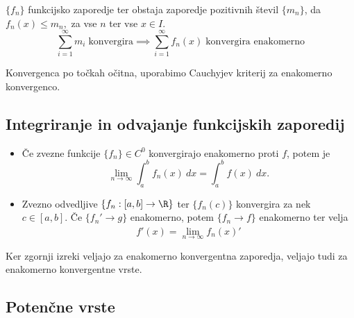 \documentclass[12pt, a4paper, unicode]{article}
\begin{document}
\begin{izrek}
$\{f_n\}$ funkcijsko zaporedje ter obstaja zaporedje pozitivnih števil $\{m_n\}$, da $f_n(x) \leq m_n,$ za vse $n$ ter vse $x \in I$. $$\sum_{i=1}^{\infty}m_i \; \text{konvergira} \implies \sum_{i=1}^{\infty}f_n(x) \; \text{konvergira enakomerno}$$
\end{izrek}
\begin{oris}
Konvergenca po točkah očitna, uporabimo Cauchyjev kriterij za enakomerno konvergenco.
\end{oris}

\subsection{Integriranje in odvajanje funkcijskih zaporedij}
\begin{izrek}
\begin{itemize}
    \item Če zvezne funkcije $\{f_n\} \in C^0$ konvergirajo enakomerno proti $f$, potem je $$\lim_{n \to \infty} \int_{a}^{b}f_n(x) \: dx = \int_a^b f(x) \: dx .$$
    \item Zvezno odvedljive $\{f_n: [a,b] \to \R\}$ ter $\{f_n(c)\}$ konvergira za nek $c \in [a,b]$. \newline Če $\{f_n' \xrightarrow[]{} g\}$ enakomerno, potem $\{f_n \xrightarrow[]{} f\}$ enakomerno ter velja $$f'(x) = \lim_{n \to \infty}f_n(x)'$$
\end{itemize}    
\end{izrek}
Ker zgornji izreki veljajo za enakomerno konvergentna zaporedja, veljajo tudi za enakomerno konvergentne vrste.

\newpage
\subsection{Potenčne vrste}
\end{document}
